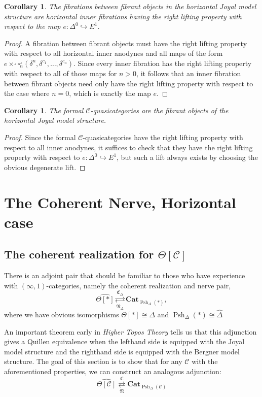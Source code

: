 \documentclass[leqno]{article}
\numberwithin{equation}{subsection}
\theoremstyle{plain}   %
\newtheorem{cor}[equation]{Corollary}
\theoremstyle{remark}
\theoremstyle{plain}
\DeclareMathOperator{\Psh}{Psh}
\newcommand{\Cat}{\ensuremath{\mathbf{Cat}}}
\newcommand{\psh}[1]{\ensuremath{\widehat{#1}}}
\newcommand{\C}{\ensuremath{\mathcal{C}}}
\newcommand{\cellset}{\ensuremath{\widehat{\Theta[\mathcal{C}]}}}
\newcommand{\spsh}{\ensuremath{\operatorname{Psh}_\Delta(\mathcal{C})}}
\begin{document}
\begin{cor}
	The fibrations between fibrant objects in the horizontal Joyal model structure are horizontal inner fibrations having the right lifting property with respect to the map \(e:\Delta^0\hookrightarrow E^1\).
\end{cor}
\begin{proof} 
	A fibration between fibrant objects must have the right lifting property with respect to all horizontal inner anodynes and all maps of the form \(e\times^\lrcorner  \square_n^\lrcorner(\delta^n,\delta^{c_1},\dots,\delta^{c_n})\).  Since every inner fibration has the right lifting property with respect to all of those maps for \(n>0\), it follows that an inner fibration between fibrant objects need only have the right lifting property with respect to the case where \(n=0\), which is exactly the map \(e\).
\end{proof}
\begin{cor}
	The formal \(\C\)-quasicategories are the fibrant objects of the horizontal Joyal model structure.
\end{cor}
\begin{proof}
	Since the formal \(\C\)-quasicategories have the right lifting property with respect to all inner anodynes, it suffices to check that they have the right lifting property with respect to \(e:\Delta^0\hookrightarrow E^1\), but such a lift always exists by choosing the obvious degenerate lift.
\end{proof}

\section{The Coherent Nerve, Horizontal case}
\subsection{The coherent realization for \(\Theta[\C]\)}
There is an adjoint pair that should be familiar to those who have experience with \((\infty,1)\)-categories, namely the coherent realization and nerve pair, \[\psh{\Theta[\ast]}  \underset{\mathfrak{N}_\Delta}{\overset{\mathfrak{C}_\Delta}{\rightleftarrows}} \Cat_{\Psh_\Delta(\ast)},\] where we have obvious isomorphisms \(\Theta[\ast]\cong \Delta\) and \(\Psh_\Delta(\ast)\cong \psh{\Delta}\)

An important theorem early in \emph{Higher Topos Theory} tells us that this adjunction gives a Quillen equivalence when the lefthand side is equipped with the Joyal model structure and the righthand side is equipped with the Bergner model structure.  The goal of this section is to show that for any \(\C\) with the aforementioned properties, we can construct an analogous adjunction:
\[\cellset \underset{\mathfrak{N}}{\overset{\mathfrak{C}}{\rightleftarrows}} \Cat_{\spsh}\]
\end{document}
